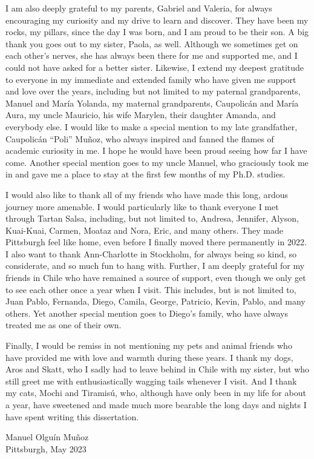 I am also deeply grateful to my parents, Gabriel and Valeria, for always encouraging my curiosity and my drive to learn and discover.
They have been my rocks, my pillars, since the day I was born, and I am proud to be their son.
A big thank you goes out to my sister, Paola, as well.
Although we sometimes get on each other's nerves, she has always been there for me and supported me, and I could not have asked for a better sister.
Likewise, I extend my deepest gratitude to everyone in my immediate and extended family who have given me support and love over the years, including but not limited to my paternal grandparents, Manuel and María Yolanda, my maternal grandparents, Caupolicán and María Aura, my uncle Mauricio, his wife Marylen, their daughter Amanda, and everybody else.
I would like to make a special mention to my late grandfather, Caupolicán ``Poli'' Muñoz, who always inspired and fanned the flames of academic curiosity in me.
I hope he would have been proud seeing how far I have come.
Another special mention goes to my uncle Manuel, who graciously took me in and gave me a place to stay at the first few months of my Ph.D. studies.

I would also like to thank all of my friends who have made this long, ardous journey more amenable.
I would particularly like to thank everyone I met through Tartan Salsa, including, but not limited to, Andresa, Jennifer, Alyson, Kuai-Kuai, Carmen, Moataz and Nora, Eric, and many others.
They made Pittsburgh feel like home, even before I finally moved there permanently in 2022.
I also want to thank Ann-Charlotte in Stockholm, for always being so kind, so considerate, and so much fun to hang with.
Further, I am deeply grateful for my friends in Chile who have remained a source of support, even though we only get to see each other once a year when I visit.
This includes, but is not limited to, Juan Pablo, Fernanda, Diego, Camila, George, Patricio, Kevin, Pablo, and many others.
Yet another special mention goes to Diego's family, who have always treated me as one of their own.


Finally, I would be remiss in not mentioning my pets and animal friends who have provided me with love and warmth during these years.
I thank my dogs, Aros and Skatt, who I sadly had to leave behind in Chile with my sister, but who still greet me with enthusiastically wagging tails whenever I visit.
And I thank my cats, Mochi and Tiramisú, who, although have only been in my life for about a year, have sweetened and made much more bearable the long days and nights I have spent writing this dissertation.

\bigskip

\noindent{}Manuel Olguín Muñoz\\
Pittsburgh, May 2023
